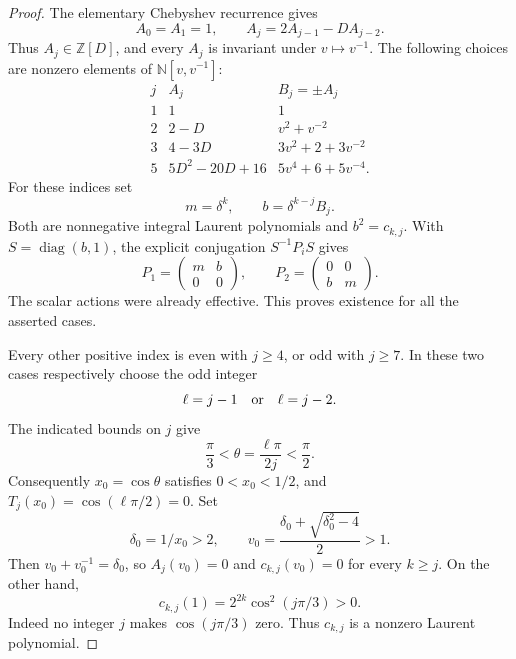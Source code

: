 \begin{proof}
The elementary Chebyshev recurrence gives
\begin{equation}\label{eq:simpleEffectivityRecurrence}
 A_0=A_1=1,\qquad A_j=2A_{j-1}-DA_{j-2}.
\end{equation}
Thus \(A_j\in\mathbb Z[D]\), and every \(A_j\) is
invariant under \(v\mapsto v^{-1}\).
The following choices are nonzero elements of
\(\mathbb N[v,v^{-1}]\):
\[
\begin{array}{c|c|c}
 j&A_j&B_j=\pm A_j\\ \hline
 1&1&1\\
 2&2-D&v^2+v^{-2}\\
 3&4-3D&3v^2+2+3v^{-2}\\
 5&5D^2-20D+16&5v^4+6+5v^{-4}.
\end{array}
\]
For these indices set
\[
             m=\delta^k,\qquad b=\delta^{k-j}B_j.
\]
Both are nonnegative integral Laurent polynomials and
\(b^2=c_{k,j}\). With \(S=\operatorname{diag}(b,1)\),
the explicit conjugation \(S^{-1}P_iS\) gives
\begin{equation}\label{eq:simpleEffectivityPositiveMatrices}
             P_1=\begin{pmatrix}m&b\\0&0\end{pmatrix},
             \qquad
             P_2=\begin{pmatrix}0&0\\b&m\end{pmatrix}.
\end{equation}
The scalar actions were already effective. This proves
existence for all the asserted cases.

Every other positive index is even with \(j\ge4\), or
odd with \(j\ge7\). In these two cases respectively choose
the odd integer
\[
 \ell=j-1\quad\hbox{or}\quad\ell=j-2.
\]
The indicated bounds on \(j\) give
\[
       \frac{\pi}{3}<\theta=\frac{\ell\pi}{2j}
                       <\frac{\pi}{2}.
\]
Consequently \(x_0=\cos\theta\) satisfies
\(0<x_0<1/2\), and
\(T_j(x_0)=\cos(\ell\pi/2)=0\).
Set
\begin{equation}\label{eq:simpleEffectivityPositiveZero}
 \delta_0=1/x_0>2,\qquad
 v_0=\frac{\delta_0+\sqrt{\delta_0^2-4}}2>1.
\end{equation}
Then \(v_0+v_0^{-1}=\delta_0\), so
\(A_j(v_0)=0\) and \(c_{k,j}(v_0)=0\) for every
\(k\ge j\). On the other hand,
\begin{equation}\label{eq:simpleEffectivityNonzeroAtOne}
       c_{k,j}(1)=2^{2k}\cos^2(j\pi/3)>0.
\end{equation}
Indeed no integer \(j\) makes \(\cos(j\pi/3)\) zero.
Thus \(c_{k,j}\) is a nonzero Laurent polynomial.


\end{proof}
